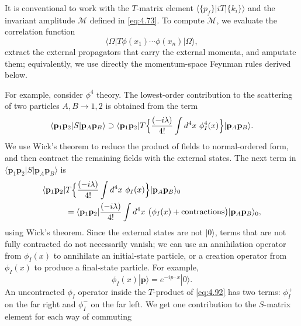 It is conventional to work with the $T$-matrix element
$\langle\{p_f\}|iT|\{k_i\}\rangle$ and the invariant amplitude
$\mathcal{M}$ defined in \eqref{eq:4.73}.  To compute $\mathcal{M}$, we
evaluate the correlation function
\begin{equation}
  \langle \Omega|T\phi(x_1)\cdots\phi(x_n)|\Omega\rangle ,
\end{equation}
extract the external propagators that carry the external momenta, and amputate
them; equivalently, we use directly the momentum-space Feynman rules derived
below.

For example, consider $\phi^4$ theory.  The lowest-order contribution to the
scattering of two particles $A, B \to 1, 2$ is obtained from the term
\begin{equation}
  \langle \mathbf{p}_1\mathbf{p}_2|S|\mathbf{p}_A\mathbf{p}_B\rangle
  \supset \langle \mathbf{p}_1\mathbf{p}_2|T\Bigl\{ \frac{(-i\lambda)}{4!}
    \int d^4x\ \phi_I^4(x) \Bigr\}|\mathbf{p}_A\mathbf{p}_B\rangle .
  \label{eq:4.91}
\end{equation}
We use Wick's theorem to reduce the product of fields to normal-ordered
form, and then contract the remaining fields with the external states.  The
next term in $\langle \mathbf{p}_1\mathbf{p}_2|S|\mathbf{p}_A\mathbf{p}_B\rangle$
is
\begin{equation}
  \begin{aligned}
    \langle \mathbf{p}_1\mathbf{p}_2|&T\Bigl\{ \frac{(-i\lambda)}{4!}
      \int d^4x\ \phi_I(x) \Bigr\}|\mathbf{p}_A\mathbf{p}_B\rangle_0\\
    &= \langle \mathbf{p}_1\mathbf{p}_2|\frac{(-i\lambda)}{4!}
      \int d^4x\ \bigl( \phi_I(x) + \text{contractions} \bigr)
      |\mathbf{p}_A\mathbf{p}_B\rangle_0 ,
  \end{aligned}
  \label{eq:4.92}
\end{equation}
using Wick's theorem.  Since the external states are not $|0\rangle$, terms
that are not fully contracted do not necessarily vanish; we can use an
annihilation operator from $\phi_I(x)$ to annihilate an initial-state
particle, or a creation operator from $\phi_I(x)$ to produce a final-state
particle.  For example,
\begin{equation}
  \phi_I(x)|\mathbf{p}\rangle = e^{-ip\cdot x}|0\rangle .
  \label{eq:4.93}
\end{equation}
An uncontracted $\phi_I$ operator inside the $T$-product of \eqref{eq:4.92}
has two terms: $\phi_I^+$ on the far right and $\phi_I^-$ on the far left.
We get one contribution to the $S$-matrix element for each way of commuting
